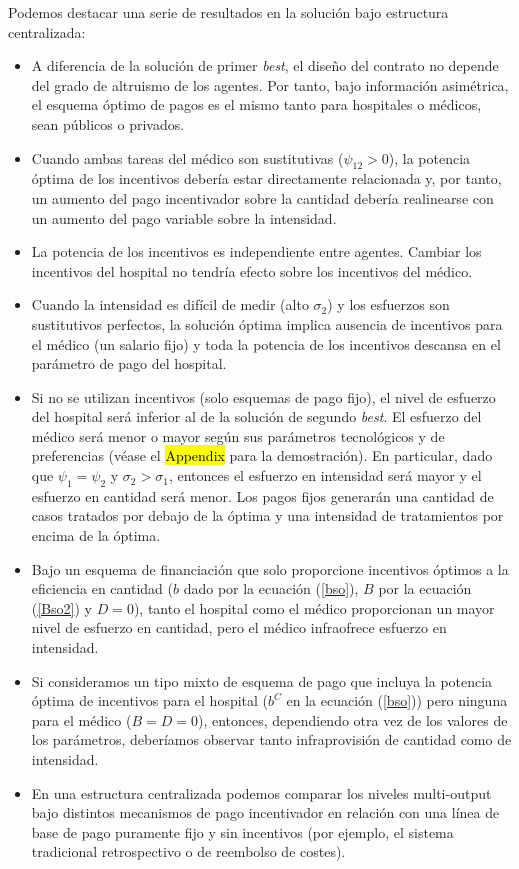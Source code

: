 ﻿\documentclass[12pt,letterpaper]{article}
\begin{document}
Podemos destacar una serie de resultados en la solución bajo estructura centralizada:
\begin{itemize}
  \item A diferencia de la solución de primer \emph{best}, el diseño del contrato no depende del grado de altruismo de los agentes. Por tanto, bajo información asimétrica, el esquema óptimo de pagos es el mismo tanto para hospitales o médicos, sean públicos o privados.
  \item Cuando ambas tareas del médico son sustitutivas ($\psi_{12}>0$), la potencia óptima de los incentivos debería estar directamente relacionada y, por tanto, un aumento del pago incentivador sobre la cantidad debería realinearse con un aumento del pago variable sobre la intensidad.
  \item La potencia de los incentivos es independiente entre agentes. Cambiar los incentivos del hospital no tendría efecto sobre los incentivos del médico.
  \item Cuando la intensidad es difícil de medir (alto $\sigma_2$) y los esfuerzos son sustitutivos perfectos, la solución óptima implica ausencia de incentivos para el médico (un salario fijo) y toda la potencia de los incentivos descansa en el parámetro de pago del hospital.
  \item Si no se utilizan incentivos (solo esquemas de pago fijo), el nivel de esfuerzo del hospital será inferior al de la solución de segundo \emph{best}. El esfuerzo del médico será menor o mayor según sus parámetros tecnológicos y de preferencias (véase el \hl{Appendix} para la demostración). En particular, dado que $\psi_1=\psi_2$ y $\sigma_2>\sigma_1$, entonces el esfuerzo en intensidad será mayor y el esfuerzo en cantidad será menor. Los pagos fijos generarán una cantidad de casos tratados por debajo de la óptima y una intensidad de tratamientos por encima de la óptima.
  \item Bajo un esquema de financiación que solo proporcione incentivos óptimos a la eficiencia en cantidad ($b$ dado por la ecuación (\ref{bso}), $B$ por la ecuación (\ref{Bso2}) y $D=0$), tanto el hospital como el médico proporcionan un mayor nivel de esfuerzo en cantidad, pero el médico infraofrece esfuerzo en intensidad.
  \item Si consideramos un tipo mixto de esquema de pago que incluya la potencia óptima de incentivos para el hospital ($b^C$ en la ecuación (\ref{bso})) pero ninguna para el médico ($B=D=0$), entonces, dependiendo otra vez de los valores de los parámetros, deberíamos observar tanto infraprovisión de cantidad como de intensidad.
  \item En una estructura centralizada podemos comparar los niveles multi-output bajo distintos mecanismos de pago incentivador en relación con una línea de base de pago puramente fijo y sin incentivos (por ejemplo, el sistema tradicional retrospectivo o de reembolso de costes).
\end{itemize}
\end{document}
